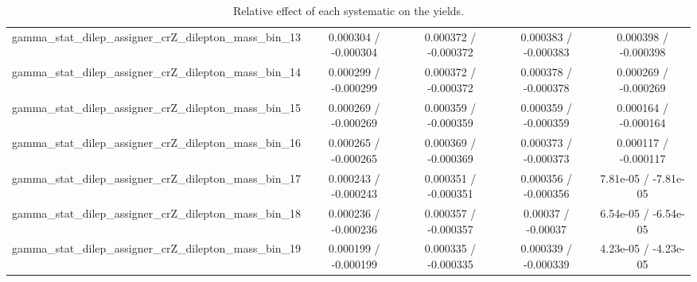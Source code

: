 \documentclass[10pt]{article}
\begin{document}
\begin{table}[htbp]
\begin{center}
\begin{tabular}{|c|c|c|c|c|}
  gamma_stat_dilep_assigner_crZ_dilepton_mass_bin_13 & 0.000304 / -0.000304 & 0.000372 / -0.000372 & 0.000383 / -0.000383 & 0.000398 / -0.000398 \\ 
  gamma_stat_dilep_assigner_crZ_dilepton_mass_bin_14 & 0.000299 / -0.000299 & 0.000372 / -0.000372 & 0.000378 / -0.000378 & 0.000269 / -0.000269 \\ 
  gamma_stat_dilep_assigner_crZ_dilepton_mass_bin_15 & 0.000269 / -0.000269 & 0.000359 / -0.000359 & 0.000359 / -0.000359 & 0.000164 / -0.000164 \\ 
  gamma_stat_dilep_assigner_crZ_dilepton_mass_bin_16 & 0.000265 / -0.000265 & 0.000369 / -0.000369 & 0.000373 / -0.000373 & 0.000117 / -0.000117 \\ 
  gamma_stat_dilep_assigner_crZ_dilepton_mass_bin_17 & 0.000243 / -0.000243 & 0.000351 / -0.000351 & 0.000356 / -0.000356 & 7.81e-05 / -7.81e-05 \\ 
  gamma_stat_dilep_assigner_crZ_dilepton_mass_bin_18 & 0.000236 / -0.000236 & 0.000357 / -0.000357 & 0.00037 / -0.00037 & 6.54e-05 / -6.54e-05 \\ 
  gamma_stat_dilep_assigner_crZ_dilepton_mass_bin_19 & 0.000199 / -0.000199 & 0.000335 / -0.000335 & 0.000339 / -0.000339 & 4.23e-05 / -4.23e-05 \\ 
\hline 
\end{tabular} 
\caption{Relative effect of each systematic on the yields.} 
\end{center} 
\end{table} 
\end{document}
